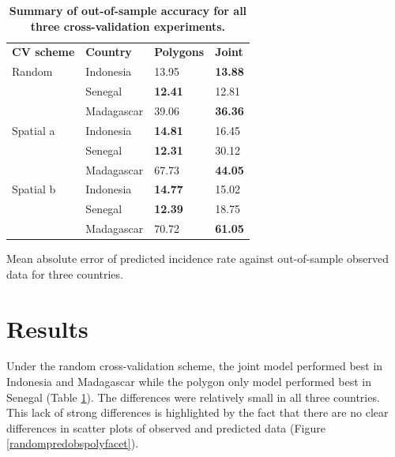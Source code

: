 \documentclass[10pt,letterpaper]{article}
\newlength\savedwidth
\newcommand\thickhline{\noalign{\global\savedwidth\arrayrulewidth\global\arrayrulewidth 2pt}%
\hline
\noalign{\global\arrayrulewidth\savedwidth}}
\begin{document}
\begin{table}[!t]
\begin{adjustwidth}{-2.25in}{0in} %
\centering
\caption{
{\bf Summary of out-of-sample accuracy for all three cross-validation experiments.}}
\begin{tabular}{llll}
\hline
{\bf CV scheme} & {\bf Country} &  {\bf Polygons} & {\bf Joint} \\
\thickhline 
Random & Indonesia  & 13.95 &  {\bf 13.88}\\
& Senegal  & {\bf 12.41} &  12.81\\
& Madagascar  & 39.06 &  {\bf 36.36}\vspace{3mm}\\
Spatial a & Indonesia & {\bf 14.81} &  16.45\\
& Senegal  & {\bf 12.31} &  30.12\\
& Madagascar & 67.73 &  {\bf 44.05} \vspace{3mm}\\
Spatial b & Indonesia & {\bf 14.77} &  15.02\\
& Senegal  & {\bf 12.39} &  18.75\\
& Madagascar  & 70.72 &  {\bf 61.05}\\
\end{tabular}
\begin{flushleft}
Mean absolute error of predicted incidence rate against out-of-sample observed data for three countries.
\end{flushleft}
\label{table1}
\end{adjustwidth}
\end{table}





\section*{Results}


Under the random cross-validation scheme, the joint model performed best in Indonesia and Madagascar while the polygon only model performed best in Senegal (Table \ref{table1}).
The differences were relatively small in all three countries.
This lack of strong differences is highlighted by the fact that there are no clear differences in scatter plots of observed and predicted data (Figure \ref{randompredobspolyfacet}).
 
\end{document}
